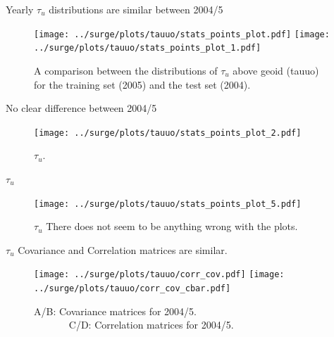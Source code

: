 \documentclass[usenames, dvipsnames]{beamer}
\begin{document}
\begin{frame}{Yearly $\tau_u$ distributions are similar between 2004/5 }
\vspace{-20pt}
\begin{figure}[htb!]
    \centering
    \texttt{[image: ../surge/plots/tauuo/stats\_points\_plot.pdf]}
     \hspace{0pt} \texttt{[image: ../surge/plots/tauuo/stats\_points\_plot\_1.pdf]}
    \vspace{-7pt}
    \caption{A comparison between the distributions of $\tau_u$ above geoid (tauuo)
     for the training set (2005) and the test set (2004).}
    \label{fig:}
\end{figure}
\end{frame}


\begin{frame}{No clear difference between 2004/5  }
\vspace{-20pt}
\begin{figure}[htb!]
    \centering
    \texttt{[image: ../surge/plots/tauuo/stats\_points\_plot\_2.pdf]}
    \vspace{-7pt}
    \caption{$\tau_u$.}
    \label{fig:}
\end{figure}
\end{frame}

\begin{frame}{$\tau_u$ }
\vspace{-20pt}
\begin{figure}[htb!]
    \centering
    \texttt{[image: ../surge/plots/tauuo/stats\_points\_plot\_5.pdf]}
    \vspace{-7pt}
    \caption{$\tau_u$ There does not seem to be anything wrong with the plots.}
    \label{fig:A}
\end{figure}
\end{frame}


\begin{frame}{$\tau_u$  Covariance and Correlation matrices are similar.  }
\vspace{-20pt}
\begin{figure}[htb!]
    \centering
    \hspace{-10pt}
    \texttt{[image: ../surge/plots/tauuo/corr\_cov.pdf]}
     \texttt{[image: ../surge/plots/tauuo/corr\_cov\_cbar.pdf]}
    \vspace{-7pt}
    \caption{A/B: Covariance matrices for 2004/5.\\
    $\quad\quad\quad\;\;$C/D: Correlation matrices for 2004/5.}
    \label{fig:}
\end{figure}
\end{frame}
\end{document}
